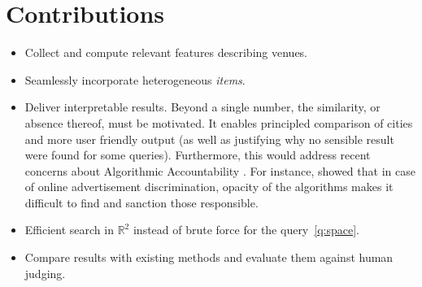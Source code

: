 \section{Contributions}

\begin{itemize}
	\item Collect and compute relevant features describing venues.
	\item Seamlessly incorporate heterogeneous \emph{items}.
	\item Deliver interpretable results. Beyond a single number, the
		similarity, or absence thereof, must be motivated. It enables
		principled comparison of cities and more user friendly output
		(as well as justifying why no sensible result were found for
		some queries). Furthermore, this would address recent
		concerns about Algorithmic Accountability
		\autocite{Accountability13}. For instance,
		\textcite{Discrimination13} showed that in case of online
		advertisement discrimination, opacity of the algorithms makes
		it difficult to find and sanction those responsible.
	\item Efficient search in $\mathbb{R}^2$ instead of brute force for
		the query~\ref{q:space}.
	\item Compare results with existing methods and evaluate them against
		human judging.
\end{itemize}
